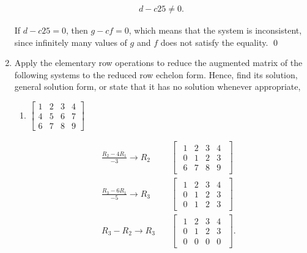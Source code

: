 \documentclass{zc-ust-hw}
\begin{document}
\begin{enumerate}
        \begin{align}
          d-c25\neq 0
        .\end{align}

        If $d-c25=0$, then $g-cf=0$, which means that the system is inconsistent, since infinitely many values of $g$ and $f$ does not satisfy the equality. 
        \qed

      \item Apply the elementary row operations to reduce the augmented matrix
        of the following systems to the reduced row echelon form. Hence, find
        its solution, general solution form, or state that it has no solution
        whenever appropriate,
        \begin{enumerate}
          \item
            $\left[\begin{array}{llll}
                1 & 2 & 3 & 4 \\
                4 & 5 & 6 & 7 \\
                6 & 7 & 8 & 9
            \end{array}\right]$

            \begin{align}
              \frac{R_2-4R_1}{-3}\rightarrow R_2
              & \quad
              \begin{bmatrix} 
                \begin{array}{ccc|c}
                  1 & 2 & 3 & 4 \\
                  0 & 1 & 2 & 3 \\
                  6 & 7 & 8 & 9
                \end{array}
              \end{bmatrix} \\
              \frac{ R_3-6R_1 }{-5}\rightarrow R_3
              & \quad
              \begin{bmatrix} 
                \begin{array}{ccc|c}
                  1 & 2 & 3 & 4 \\
                  0 & 1 & 2 & 3 \\
                  0 & 1 & 2 & 3
                \end{array}
              \end{bmatrix} \\
              R_3-R_2\rightarrow R_3
              & \quad
              \begin{bmatrix} 
                \begin{array}{ccc|c}
                  1 & 2 & 3 & 4 \\
                  0 & 1 & 2 & 3 \\
                  0 & 0 & 0 & 0
                \end{array}
              \end{bmatrix}
            .\end{align}


\end{enumerate}
\end{enumerate}
\end{document}
